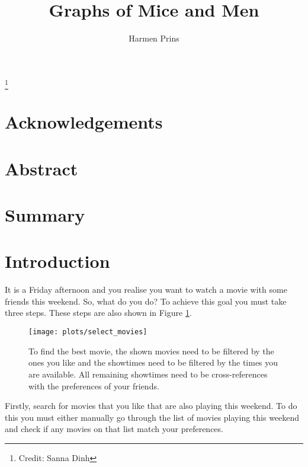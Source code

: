 \documentclass{article}
\title{Graphs of Mice and Men}
\author{Harmen Prins}
\begin{document}
 \maketitle
 
 \footnote{Credit: Sanna Dinh}
 \newpage
 
 \section*{Acknowledgements}
 \section*{Abstract}  
 
 \section*{Summary}
 \tableofcontents
 \newpage
 
 
 \section{Introduction} \label{intro}
 It is a Friday afternoon and you realise you want to watch a movie with some friends this weekend. So, what do you do? To achieve this goal you must take three steps. These steps are also shown in Figure \ref{movies}.
  
 \begin{figure}[H]
 \centering
 \texttt{[image: plots/select\_movies]}
 \caption[Movie selection process]{To find the best movie, the shown movies need to be filtered by the ones you like and the showtimes need to be filtered by the times you are available. All remaining showtimes need to be cross-references with the preferences of your friends.}
 \label{movies}
 \end{figure}
 
 Firstly, search for movies that you like that are also playing this weekend. To do this you must either manually go through the list of movies playing this weekend and check if any movies on that list match your preferences.
 
\end{document}
